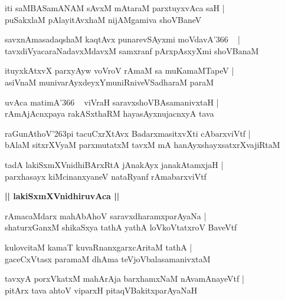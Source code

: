 \documentclass[twoside,12pt,openright]{book}
\def\S{\char'263}
\newcounter{shloka}[chapter]
\def\uvaca#1{\centerline{{\large\textbf{#1}}}}
\begin{document}
\begin{shloka}%
iti saMBASamANAM sAvxM mAtaraM parxtuyxvAca saH |\\
puSakxlaM pAlayitAvxhaM nijAMgamiva shoVBaneV 
\end{shloka}

\begin{shloka}%
savxnAmasadaqshaM kaqtAvx punarevSAyxmi moVdavA\char'366 ~ |\\
tavxdiVyacaraNadavxMdavxM samxranf pArxpAsxyXmi shoVBanaM 
\end{shloka}

\begin{shloka}%
ituyxkAtxvX parxyAyw voVroV rAmaM sa muKamaMTapeV |\\
asiVnaM munivarAyxdeyxYmuniRniveVSadharaM paraM 
\end{shloka}

\begin{shloka}%
uvAca matimA\char'366 ~ viVraH saravxshoVBAsamanivxtaH |\\
rAmAjAcnxpaya rakASxthaRM hayasAyxnujacnxyA tava
\end{shloka}

\begin{shloka}%
raGunAthoV\S pi tacuCxrXtAvx BadarxmasitxvXti cAbarxviVtf |\\
bAlaM sitxrXVyaM parxmutatxM tavxM mA hanAyxshayxsatxrXvajiRtaM  
\end{shloka}

\begin{shloka}%
tadA lakiSxmXVnidhiBArxRtA jAnakAyx janakAtamxjaH |\\
parxhasayx kiMcinanxyaneV nataRyanf rAmabarxviVtf 
\end{shloka}

\uvaca{|| lakiSxmXVnidhiruvAca ||}

\begin{shloka}%
rAmacaMdarx mahAbAhoV saravxdharamxparAyaNa |\\
shaturxGanxM shikaSxya tathA yathA loVkoVtatxroV BaveVtf 
\end{shloka}

\begin{shloka}%
kulovcitaM kamaT kuvaRnanxgarxcAritaM tathA |\\
gaceCxVtasx paramaM dhAma teVjoVbalasamanivxtaM
\end{shloka}

\begin{shloka}%
tavxyA porxVkatxM mahArAja barxhamxNaM nAvamAnayeVtf |\\
pitArx tava ahtoV viparxH pitaqVBakitxparAyaNaH 
\end{shloka}
\end{document}
